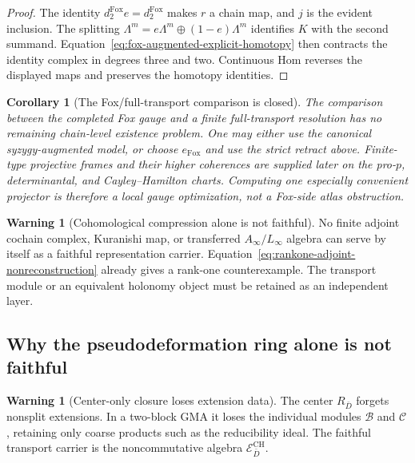 \documentclass[11pt]{article}
\newtheorem{corollary}[theorem]{Corollary}
\theoremstyle{definition}
\newtheorem{warning}[theorem]{Warning}
\begin{document}
\begin{proof}
The identity $d_2^{\mathrm{Fox}}e=d_2^{\mathrm{Fox}}$ makes $r$ a chain map,
and $j$ is the evident inclusion.  The splitting
$\Lambda^m=e\Lambda^m\oplus(1-e)\Lambda^m$ identifies
$K$ with the second summand.  Equation~\eqref{eq:fox-augmented-explicit-homotopy}
then contracts the identity complex in degrees three and two.  Continuous Hom
reverses the displayed maps and preserves the homotopy identities.
\end{proof}

\begin{corollary}[The Fox/full-transport comparison is closed]\label{cor:fox-full-comparison-closed}
The comparison between the completed Fox gauge and a finite full-transport
resolution has no remaining chain-level existence problem.  One may either
use the canonical syzygy-augmented model, or choose $e_{\mathrm{Fox}}$ and use
the strict retract above.  Finite-type projective frames and their higher
coherences are supplied later on the pro-$p$, determinantal, and
Cayley--Hamilton charts.  Computing one especially convenient projector is
therefore a local gauge optimization, not a Fox-side atlas obstruction.
\end{corollary}

\begin{warning}[Cohomological compression alone is not faithful]\label{warn:cochain-not-transport-reconstruction}
No finite adjoint cochain complex, Kuranishi map, or transferred
$A_\infty/L_\infty$ algebra can serve by itself as a faithful representation
carrier.  Equation~\eqref{eq:rankone-adjoint-nonreconstruction} already gives
a rank-one counterexample.  The transport module or an equivalent holonomy
object must be retained as an independent layer.
\end{warning}

\subsection{Why the pseudodeformation ring alone is not faithful}

\begin{warning}[Center-only closure loses extension data]\label{warn:pseudorep-not-faithful}
The center $R_{\bar D}$ forgets nonsplit extensions.  In a two-block GMA it loses the individual modules $\mathcal B$ and $\mathcal C$, retaining only coarse products such as the reducibility ideal.  The faithful transport carrier is the noncommutative algebra $\mathcal E^{\mathrm{CH}}_{\bar D}$.
\end{warning}
\end{document}
